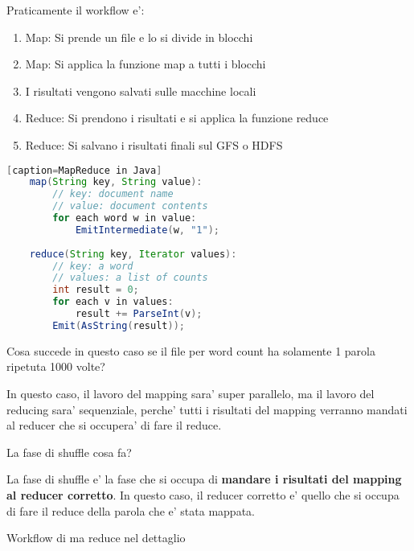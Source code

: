 Praticamente il workflow e':
\begin{enumerate}
    \item Map: Si prende un file e lo si divide in blocchi
    \item Map: Si applica la funzione map a tutti i blocchi
    \item I risultati vengono salvati sulle macchine locali 
    \item Reduce: Si prendono i risultati e si applica la funzione reduce
    \item Reduce: Si salvano i risultati finali sul GFS o HDFS
\end{enumerate}

\begin{lstlisting}[language=java][caption=MapReduce in Java]
    map(String key, String value):
        // key: document name
        // value: document contents
        for each word w in value:
            EmitIntermediate(w, "1");
    
    reduce(String key, Iterator values):
        // key: a word
        // values: a list of counts
        int result = 0;
        for each v in values:
            result += ParseInt(v);
        Emit(AsString(result));
\end{lstlisting}


\begin{domanda}
    Cosa succede in questo caso se il file per word count ha solamente 1 parola ripetuta 1000 volte?
\end{domanda}

In questo caso, il lavoro del mapping sara' super parallelo, ma il lavoro 
del reducing sara' sequenziale, perche' tutti i risultati del mapping
verranno mandati al reducer che si occupera' di fare il reduce.

\begin{domanda}
    La fase di shuffle cosa fa?
\end{domanda}

La fase di shuffle e' la fase che si occupa di \textbf{mandare i risultati del mapping
al reducer corretto}. In questo caso, il reducer corretto e' quello che si occupa
di fare il reduce della parola che e' stata mappata.


\begin{domanda}
    Workflow di ma reduce nel dettaglio
\end{domanda}


